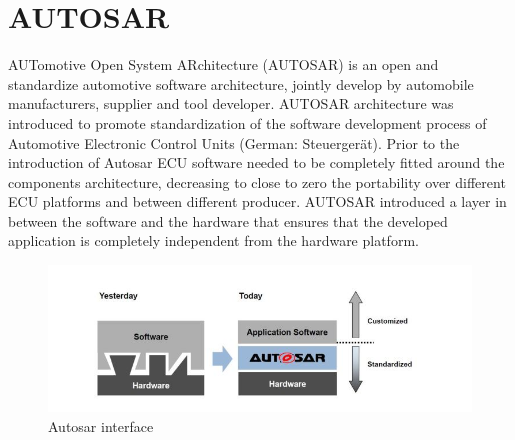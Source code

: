 \documentclass[../main.tex]{subfiles}
\begin{document}
\section{AUTOSAR}
AUTomotive Open System ARchitecture (AUTOSAR) is an open and standardize automotive software architecture, jointly develop by automobile manufacturers, supplier and tool developer. AUTOSAR architecture was introduced to promote standardization of the software development process of Automotive Electronic Control Units (German: Steuergerät). Prior to the introduction of Autosar ECU software needed to be completely fitted around the components architecture, decreasing to close to zero the portability over different ECU platforms and between different producer. 
AUTOSAR introduced a layer in between the software and the hardware that ensures that the developed application is completely independent from the hardware platform. 
\begin{figure}[h]
    \centering
    \includegraphics[width=\linewidth]{images_folder/autosarcapture.jpg}
    \caption{Autosar interface}
    \label{fig:AUTCA}
\end{figure}
\end{document}
